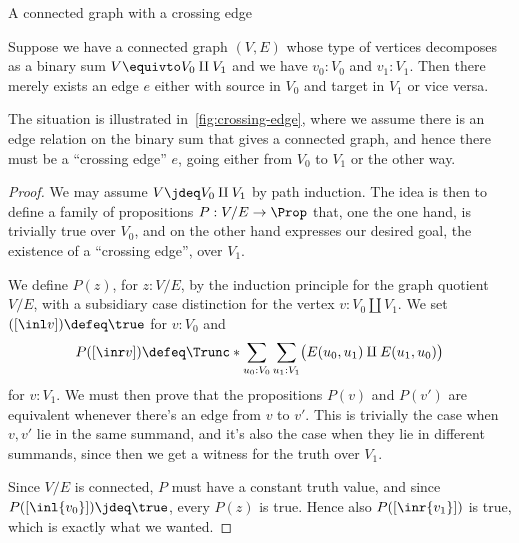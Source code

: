 \begin{marginfigure}
  \caption{A connected graph with a crossing edge}
  \label{fig:crossing-edge}
\end{marginfigure}
\begin{lemma}\label{lem:crossing-edge}
  Suppose we have a connected graph $(V,E)$ whose type of vertices
  decomposes as a binary sum $V \equivto V_0 \amalg V_1$
  and we have $v_0:V_0$ and $v_1:V_1$.
  Then there merely exists an edge $e$ either with source in $V_0$ and target in $V_1$
  or vice versa.
\end{lemma}
The situation is illustrated in~\cref{fig:crossing-edge}, where we assume
there is an edge relation on the binary sum that gives a connected graph,
and hence there must be a ``crossing edge'' $e$, going either from $V_0$ to $V_1$
or the other way.
\begin{proof}
  We may assume $V \jdeq V_0 \amalg V_1$ by path induction.
  The idea is then to define a family of propositions $P : V/E \to \Prop$
  that, one the one hand, is trivially true over $V_0$, and on the other hand
  expresses our desired goal, the existence of a ``crossing edge'', over $V_1$.

  We define $P(z)$, for $z:V/E$, by the induction principle for the graph quotient $V/E$,
  with a subsidiary case distinction for the vertex $v : V_0 \amalg V_1$.
  We set $([\inl v]) \defeq \true$ for $v : V_0$ and
  \[
    P([\inr v]) \defeq \Trunc*{\sum_{u_0:V_0}\sum_{u_1:V_1}
      \bigl(E(u_0,u_1) \amalg E(u_1,u_0)\bigr)}
  \]
  for $v : V_1$.
  We must then prove that the propositions $P(v)$ and $P(v')$ are equivalent
  whenever there's an edge from $v$ to $v'$.
  This is trivially the case when $v,v'$ lie in the same summand,
  and it's also the case when they lie in different summands, since then
  we get a witness for the truth over $V_1$.

  Since $V/E$ is connected, $P$ must have a constant truth value,
  and since $P([\inl{v_0}])\jdeq\true$, every $P(z)$ is true.
  Hence also $P([\inr{v_1}])$ is true, which is exactly what we wanted.
\end{proof}

